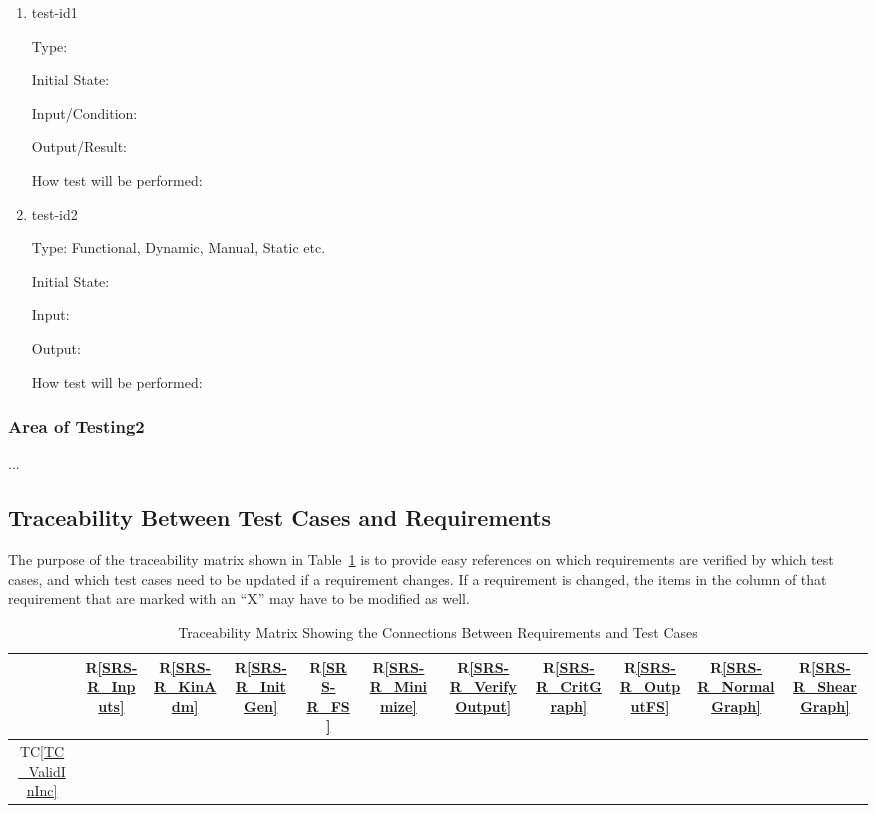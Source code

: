 \documentclass[12pt, titlepage]{article}
\newcommand{\rref}[1]{R\ref{#1}}
\newcommand{\tcref}[1]{TC\ref{#1}}
\begin{document}
\begin{enumerate}

\item{test-id1\\}

Type: 
					
Initial State: 
					
Input/Condition: 
					
Output/Result: 
					
How test will be performed: 
					
\item{test-id2\\}

Type: Functional, Dynamic, Manual, Static etc.
					
Initial State: 
					
Input: 
					
Output: 
					
How test will be performed: 

\end{enumerate}

\subsubsection{Area of Testing2}

...

\subsection{Traceability Between Test Cases and Requirements}

\noindent The purpose of the traceability matrix shown in 
Table~\ref{Table:T_trace} is to provide easy 
references on which requirements are verified by which test cases, and which 
test cases need to be updated if a requirement changes.  If a requirement is 
changed, the items in the column of that requirement that are marked
with an ``X'' may have to be modified as well. 

\begin{table}[!h]
	\centering
	\begin{tabular}{|c|c|c|c|c|c|c|c|c|c|c|}
		\hline
		& \rref{SRS-R_Inputs}& \rref{SRS-R_KinAdm}& \rref{SRS-R_InitGen}& 
		\rref{SRS-R_FS}& \rref{SRS-R_Minimize} & \rref{SRS-R_VerifyOutput}& 
		\rref{SRS-R_CritGraph}& \rref{SRS-R_OutputFS}& 
		\rref{SRS-R_NormalGraph}& \rref{SRS-R_ShearGraph} \\
		\hline
		\tcref{TC_ValidInInc}       & & & & & & & & & & \\ \hline
		\hline
	\end{tabular}
	\caption{Traceability Matrix Showing the Connections Between Requirements 
	and Test Cases}
	\label{Table:T_trace}
\end{table}
\end{document}
